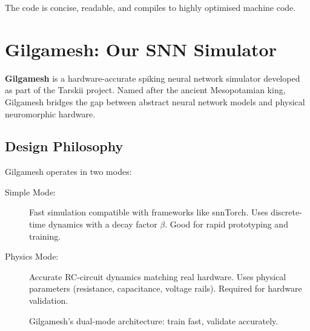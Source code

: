 \documentclass[11pt,a4paper]{article}
\begin{document}
The code is concise, readable, and compiles to highly optimised machine code.

\section{Gilgamesh: Our SNN Simulator}

\textbf{Gilgamesh} is a hardware-accurate spiking neural network simulator developed as part of the Tarskii project. Named after the ancient Mesopotamian king, Gilgamesh bridges the gap between abstract neural network models and physical neuromorphic hardware.

\subsection{Design Philosophy}

Gilgamesh operates in two modes:

\begin{description}
    \item[Simple Mode:] Fast simulation compatible with frameworks like snnTorch. Uses discrete-time dynamics with a decay factor $\beta$. Good for rapid prototyping and training.

    \item[Physics Mode:] Accurate RC-circuit dynamics matching real hardware. Uses physical parameters (resistance, capacitance, voltage rails). Required for hardware validation.
\end{description}

\begin{figure}[H]
\centering
{}
\caption{Gilgamesh's dual-mode architecture: train fast, validate accurately.}
\end{figure}
\end{document}
